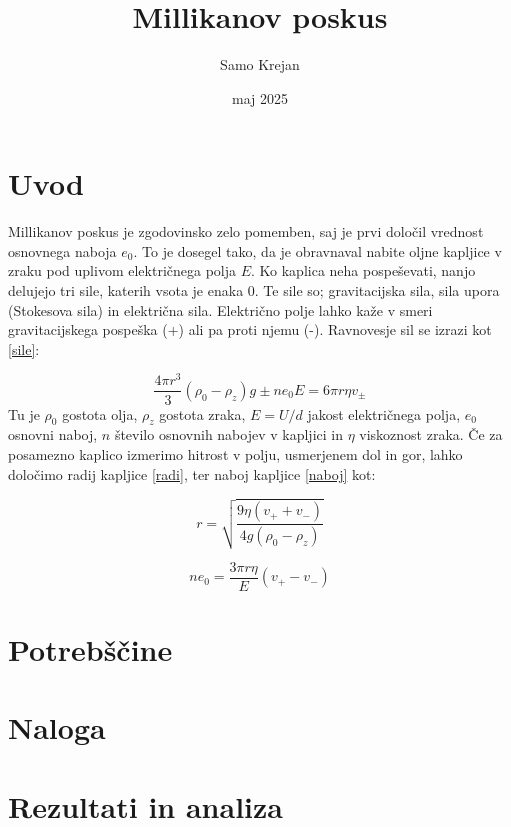 \documentclass[12pt]{article}
\title{\textbf{Millikanov poskus}}
\author{Samo Krejan}
\date{maj 2025}
\begin{document}
\maketitle

\section{Uvod}

Millikanov poskus je zgodovinsko zelo pomemben, saj je prvi določil vrednost osnovnega naboja $e_0$. To je dosegel tako, da je obravnaval nabite oljne kapljice v zraku pod uplivom električnega polja $E$. Ko kaplica neha pospeševati, nanjo delujejo tri sile, katerih vsota je enaka $0$. Te sile so; gravitacijska sila, sila upora (Stokesova sila) in električna sila. Električno polje lahko kaže v smeri gravitacijskega pospeška (+) ali pa proti njemu (-). Ravnovesje sil se izrazi kot \ref{sile}:

\begin{equation}
    \frac{4\pi r^3}{3} (\rho_0-\rho_z)g \pm n e_0 E = 6\pi r \eta v_\pm
    \label{sile}
\end{equation}
Tu je $\rho_0$ gostota olja, $\rho_z$ gostota zraka, $E = U/d$ jakost električnega polja, $e_0$ osnovni naboj, $n$ število osnovnih nabojev v kapljici in $\eta$ viskoznost zraka. Če za posamezno kaplico izmerimo hitrost v polju, usmerjenem dol in gor, lahko določimo radij kapljice \ref{radi}, ter naboj kapljice \ref{naboj} kot:

\begin{equation}
    r = \sqrt{\frac{9 \eta (v_+ + v_-)}{4g(\rho_0-\rho_z)}}
    \label{radi}
\end{equation}

\begin{equation}
    ne_0 = \frac{3\pi r \eta}{E}(v_+ - v_-)
    \label{naboj}
\end{equation}

\section{Potrebščine}


\section{Naloga}


\section{Rezultati in analiza}
\end{document}
